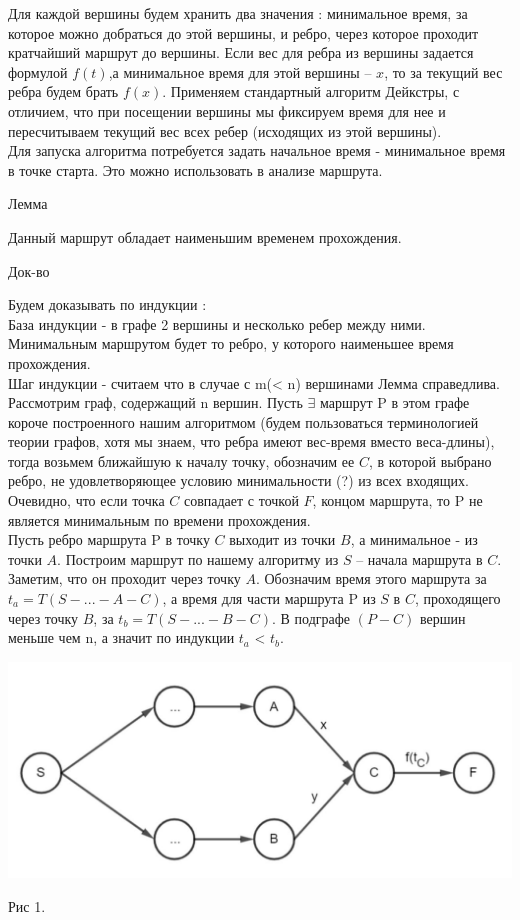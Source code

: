 \documentclass[12pt, a4paper]{article}
\begin{document}
Для каждой вершины будем хранить два значения : минимальное время, за которое можно добраться до этой вершины, и ребро, через которое проходит кратчайший маршрут до вершины.
Если вес для ребра из вершины задается формулой $f(t)$,а минимальное время для этой вершины -- $x$, то за текущий вес ребра будем брать $f(x)$.
Применяем стандартный алгоритм Дейкстры, с отличием, что при посещении вершины мы фиксируем время для нее и пересчитываем текущий вес всех ребер (исходящих из этой вершины).\\
Для запуска алгоритма потребуется задать начальное время - минимальное время в точке старта. Это можно использовать в анализе маршрута.

$\textbf{Лемма}$

Данный маршрут обладает наименьшим временем прохождения.

$\textit{Док-во}$

Будем доказывать по индукции :\\
База индукции - в графе 2 вершины и несколько ребер между ними. Минимальным маршрутом будет то ребро, у которого наименьшее время прохождения.\\
Шаг индукции - считаем что в случае с m(< n) вершинами Лемма справедлива. Рассмотрим граф, содержащий n вершин. Пусть $\exists$ маршрут P в этом графе короче построенного нашим алгоритмом (будем пользоваться терминологией теории графов, хотя мы знаем, что ребра имеют вес-время вместо веса-длины), тогда возьмем ближайшую к началу точку, обозначим ее $C$, в которой выбрано ребро, не удовлетворяющее условию минимальности (?) из всех входящих. Очевидно, что если точка $C$ совпадает с точкой $F$, концом маршрута, то P не является минимальным по времени прохождения. \\
 Пусть ребро маршрута P в точку $C$ выходит из точки $B$, а минимальное - из точки $A$. Построим маршрут по нашему алгоритму из $S$ -- начала маршрута в $C$. Заметим, что он проходит через точку $A$. Обозначим время этого маршрута за $t_a = T(S-...-A-C)$, а время для части маршрута P из $S$ в $C$, проходящего через точку $B$, за $t_b = T(S-...-B-C)$. В подграфе $(P-C)$ вершин меньше чем n, а значит по индукции $t_a$ < $t_b$. 
\begin{center}
\includegraphics[scale=0.3]{graph_1.jpg}
\end{center}
\begin{center}
Рис 1.
\end{center}
\end{document}
